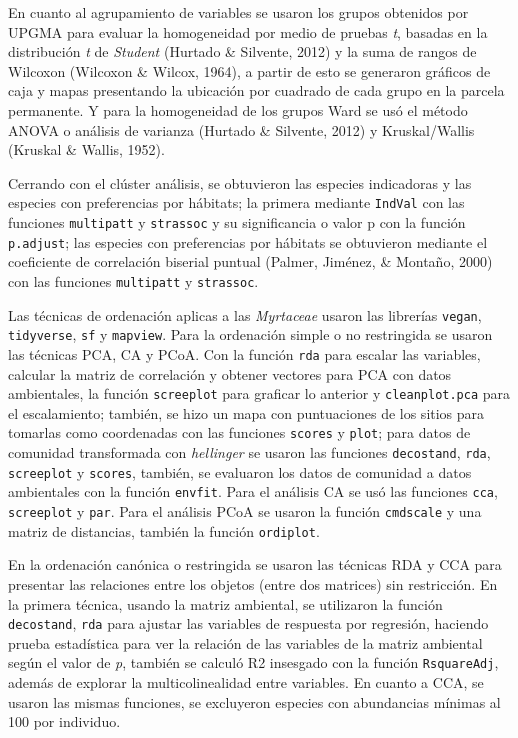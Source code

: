 \documentclass[11pt,]{article}
\begin{document}
En cuanto al agrupamiento de variables se usaron los grupos obtenidos
por UPGMA para evaluar la homogeneidad por medio de pruebas \emph{t},
basadas en la distribución \emph{t} de \emph{Student} (Hurtado \&
Silvente, 2012) y la suma de rangos de Wilcoxon (Wilcoxon \& Wilcox,
1964), a partir de esto se generaron gráficos de caja y mapas
presentando la ubicación por cuadrado de cada grupo en la parcela
permanente. Y para la homogeneidad de los grupos Ward se usó el método
ANOVA o análisis de varianza (Hurtado \& Silvente, 2012) y
Kruskal/Wallis (Kruskal \& Wallis, 1952).

Cerrando con el clúster análisis, se obtuvieron las especies indicadoras
y las especies con preferencias por hábitats; la primera mediante
\texttt{IndVal} con las funciones \texttt{multipatt} y \texttt{strassoc}
y su significancia o valor p con la función \texttt{p.adjust}; las
especies con preferencias por hábitats se obtuvieron mediante el
coeficiente de correlación biserial puntual (Palmer, Jiménez, \&
Montaño, 2000) con las funciones \texttt{multipatt} y \texttt{strassoc}.

Las técnicas de ordenación aplicas a las \emph{Myrtaceae} usaron las
librerías \texttt{vegan}, \texttt{tidyverse}, \texttt{sf} y
\texttt{mapview}. Para la ordenación simple o no restringida se usaron
las técnicas PCA, CA y PCoA. Con la función \texttt{rda} para escalar
las variables, calcular la matriz de correlación y obtener vectores para
PCA con datos ambientales, la función \texttt{screeplot} para graficar
lo anterior y \texttt{cleanplot.pca} para el escalamiento; también, se
hizo un mapa con puntuaciones de los sitios para tomarlas como
coordenadas con las funciones \texttt{scores} y \texttt{plot}; para
datos de comunidad transformada con \emph{hellinger} se usaron las
funciones \texttt{decostand}, \texttt{rda}, \texttt{screeplot} y
\texttt{scores}, también, se evaluaron los datos de comunidad a datos
ambientales con la función \texttt{envfit}. Para el análisis CA se usó
las funciones \texttt{cca}, \texttt{screeplot} y \texttt{par}. Para el
análisis PCoA se usaron la función \texttt{cmdscale} y una matriz de
distancias, también la función \texttt{ordiplot}.

En la ordenación canónica o restringida se usaron las técnicas RDA y CCA
para presentar las relaciones entre los objetos (entre dos matrices) sin
restricción. En la primera técnica, usando la matriz ambiental, se
utilizaron la función \texttt{decostand}, \texttt{rda} para ajustar las
variables de respuesta por regresión, haciendo prueba estadística para
ver la relación de las variables de la matriz ambiental según el valor
de \emph{p}, también se calculó R2 insesgado con la función
\texttt{RsquareAdj}, además de explorar la multicolinealidad entre
variables. En cuanto a CCA, se usaron las mismas funciones, se
excluyeron especies con abundancias mínimas al 100 por individuo.
\end{document}
